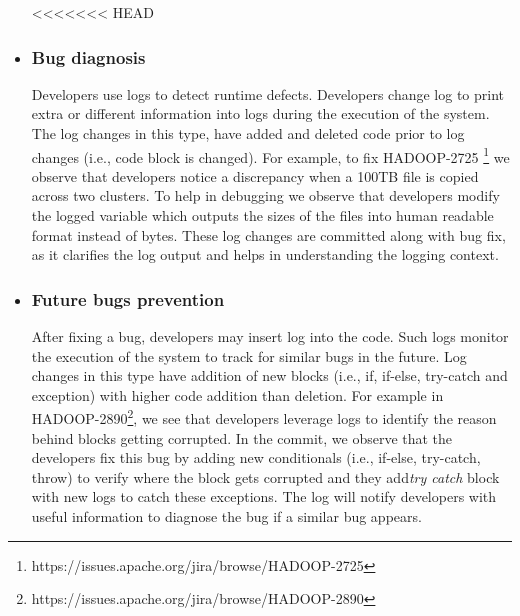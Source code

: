 \begin{itemize}
	

<<<<<<< HEAD
\item \subsubsection*{Bug diagnosis} Developers use logs to detect runtime defects. Developers change log to print extra or different information into logs during the execution of the system. The log changes in this type, have added and deleted code prior to log changes (i.e., code block is changed). For example, to fix HADOOP-2725 \footnote{https://issues.apache.org/jira/browse/HADOOP-2725} we observe that developers notice a discrepancy when a 100TB file is copied across two clusters. To help in debugging we observe that developers modify the logged variable which outputs the sizes of the files into human readable format instead of bytes. These log changes are committed along with bug fix, as it clarifies the log output and helps in understanding the logging context.


\item \subsubsection*{Future bugs prevention} After fixing a bug, developers may insert log into the code. Such logs monitor the execution of the system to track for similar bugs in the future. Log changes in this type have addition of new blocks (i.e., if, if-else, try-catch and exception) with higher code addition than deletion. For example in HADOOP-2890\footnote{https://issues.apache.org/jira/browse/HADOOP-2890}, we see that developers leverage logs to identify the reason behind blocks getting corrupted. In the commit, we observe that the developers fix this bug by adding new conditionals (i.e., if-else, try-catch, throw) to verify where the block gets corrupted and they add\textsl{try catch} block with new logs to catch these exceptions. The log will notify developers with useful information to diagnose the bug if a similar bug appears.


\end{itemize}
